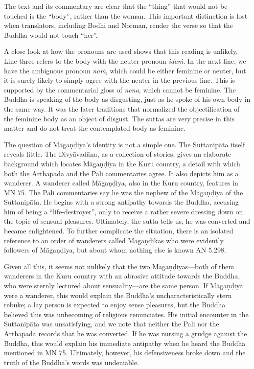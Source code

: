 \documentclass[12pt,openany]{book}%
\begin{document}
The text and its commentary are clear that the “thing” that would not be touched is the “body”, rather than the woman. This important distinction is lost when translators, including Bodhi and Norman, render the verse so that the Buddha would not touch “her”.

A close look at how the pronouns are used shows that this reading is unlikely. Line three refers to the body with the neuter pronoun \textit{\textsanskrit{idaṁ}}. In the next line, we have the ambiguous pronoun \textit{\textsanskrit{naṁ}}, which could be either feminine or neuter, but it is surely likely to simply agree with the neuter in the previous line. This is supported by the commentarial gloss of \textit{nena}, which cannot be feminine. The Buddha is speaking of the body as disgusting, just as he spoke of his own body in the same way. It was the later traditions that normalized the objectification of the feminine body as an object of disgust. The suttas are very precise in this matter and do not treat the contemplated body as feminine.

The question of \textsanskrit{Māgaṇḍiya}’s identity is not a simple one. The \textsanskrit{Suttanipāta} itself reveals little. The \textsanskrit{Divyāvadāna}, as a collection of stories, gives an elaborate background which locates \textsanskrit{Māgaṇḍiya} in the Kuru country, a detail with which both the Arthapada and the Pali commentaries agree. It also depicts him as a wanderer. A wanderer called \textsanskrit{Māgaṇḍiya}, also in the Kuru country, features in MN 75. The Pali commentaries say he was the nephew of the \textsanskrit{Māgaṇḍiya} of the \textsanskrit{Suttanipāta}. He begins with a strong antipathy towards the Buddha, accusing him of being a “life-destroyer”, only to receive a rather severe dressing down on the topic of sensual pleasures. Ultimately, the sutta tells us, he was converted and became enlightened. To further complicate the situation, there is an isolated reference to an order of wanderers called \textsanskrit{Māgaṇḍikas} who were evidently followers of \textsanskrit{Māgaṇḍiya}, but about whom nothing else is known AN 5.298.

Given all this, it seems not unlikely that the two \textsanskrit{Māgaṇḍiyas}—both of them wanderers in the Kuru country with an abrasive attitude towards the Buddha, who were sternly lectured about sensuality—are the same person. If \textsanskrit{Māgaṇḍiya} were a wanderer, this would explain the Buddha’s uncharacteristically stern rebuke; a lay person is expected to enjoy sense pleasures, but the Buddha believed this was unbecoming of religious renunciates. His initial encounter in the \textsanskrit{Suttanipāta} was unsatisfying, and we note that neither the Pali nor the Arthapada records that he was converted. If he was nursing a grudge against the Buddha, this would explain his immediate antipathy when he heard the Buddha mentioned in MN 75. Ultimately, however, his defensiveness broke down and the truth of the Buddha’s words was undeniable.
\end{document}
